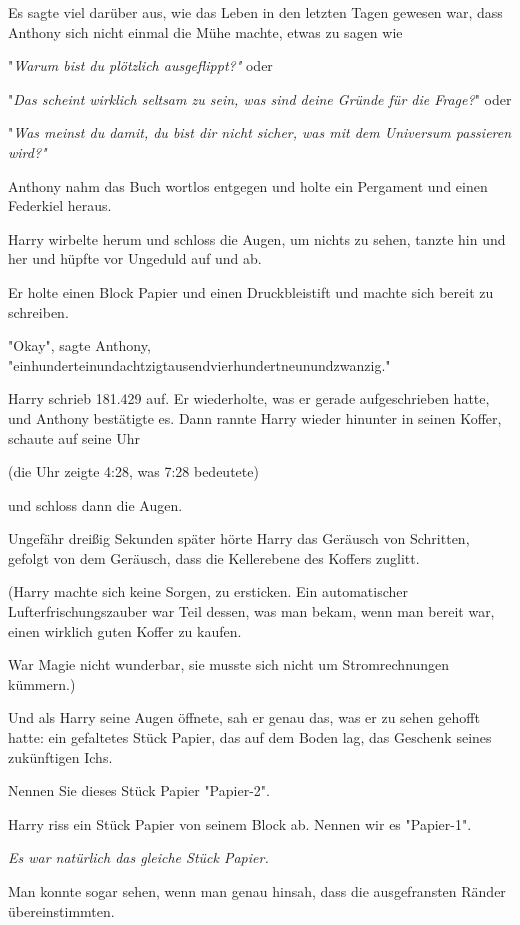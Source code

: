 {Es sagte viel darüber aus, wie das Leben in den letzten Tagen gewesen war, dass Anthony sich nicht einmal die Mühe machte, etwas zu sagen wie

"\emph{Warum bist du plötzlich ausgeflippt?"} oder

"\emph{Das scheint wirklich seltsam zu sein, was sind deine Gründe für die Frage?}" oder

"\emph{Was meinst du damit, du bist dir nicht sicher, was mit dem Universum passieren wird?"}

Anthony nahm das Buch wortlos entgegen und holte ein Pergament und einen Federkiel heraus.

Harry wirbelte herum und schloss die Augen, um nichts zu sehen, tanzte hin und her und hüpfte vor Ungeduld auf und ab.

Er holte einen Block Papier und einen Druckbleistift und machte sich bereit zu schreiben.

"Okay", sagte Anthony, "einhunderteinundachtzigtausendvierhundertneunundzwanzig."

Harry schrieb 181.429 auf. Er wiederholte, was er gerade aufgeschrieben hatte, und Anthony bestätigte es. Dann rannte Harry wieder hinunter in seinen Koffer, schaute auf seine Uhr

(die Uhr zeigte 4:28, was 7:28 bedeutete)

und schloss dann die Augen.

Ungefähr dreißig Sekunden später hörte Harry das Geräusch von Schritten, gefolgt von dem Geräusch, dass die Kellerebene des Koffers zuglitt.

(Harry machte sich keine Sorgen, zu ersticken. Ein automatischer Lufterfrischungszauber war Teil dessen, was man bekam, wenn man bereit war, einen wirklich guten Koffer zu kaufen.

War Magie nicht wunderbar, sie musste sich nicht um Stromrechnungen kümmern.)

Und als Harry seine Augen öffnete, sah er genau das, was er zu sehen gehofft hatte: ein gefaltetes Stück Papier, das auf dem Boden lag, das Geschenk seines zukünftigen Ichs.

Nennen Sie dieses Stück Papier "Papier-2".

Harry riss ein Stück Papier von seinem Block ab. Nennen wir es "Papier-1".

\emph{Es war natürlich das gleiche Stück Papier.}

Man konnte sogar sehen, wenn man genau hinsah, dass die ausgefransten Ränder übereinstimmten.

}
